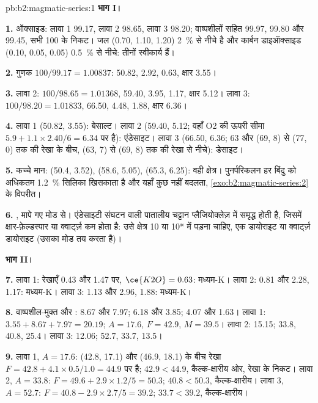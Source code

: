 \begin{solution}{pb:b2:magmatic-series:1}
\noindent\textbf{भाग I।}

\textbf{1.} ऑक्साइड: लावा 1 99.17, लावा 2 98.65, लावा 3 98.20; वाष्पशीलों सहित
99.97, 99.80 और 99.45, सभी 100 के निकट। जल (0.70, 1.10, 1.20)
\qty{2}{\percent} से नीचे है और कार्बन डाइऑक्साइड (0.10, 0.05, 0.05) \qty{0.5}{\percent} से नीचे: तीनों
स्वीकार्य हैं।

\textbf{2.} गुणक $100/99.17 = 1.00837$:  50.82,  2.92, 
0.63, क्षार 3.55।

\textbf{3.} लावा 2: $100/98.65 = 1.01368$,  59.40,  3.95, 
1.17, क्षार 5.12। लावा 3: $100/98.20 = 1.01833$,  66.50,  4.48,
 1.88, क्षार 6.36।

\textbf{4.} लावा 1 (50.82, 3.55): बेसाल्ट। लावा 2 (59.40, 5.12; वहाँ O2 की ऊपरी सीमा
$5.9 + 1.1\times2.40/6 = 6.34$ पर है): एंडेसाइट। लावा 3 (66.50, 6.36; 63
और (69, 8) से (77, 0) तक की रेखा के बीच, (63, 7) से (69, 8) तक की रेखा से नीचे): डेसाइट।

\textbf{5.} कच्चे मान: (50.4, 3.52), (58.6, 5.05), (65.3, 6.25): वही क्षेत्र।
पुनर्परिकलन हर बिंदु को अधिकतम \qty{1.2}{\percent} सिलिका खिसकाता है और
यहाँ कुछ नहीं बदलता, \cref{exo:b2:magmatic-series:2} के विपरीत।

\textbf{6.} , मापे गए मोड से। एंडेसाइटी संघटन वाली पातालीय चट्टान
प्लैजियोक्लेज़ में समृद्ध होती है, जिसमें क्षार-फ़ेल्डस्पार या क्वार्ट्ज़ कम होता है: उसे
क्षेत्र 10 या 10* में पड़ना चाहिए, एक डायोराइट या क्वार्ट्ज़ डायोराइट (उसका मोड तय करता है)।

\noindent\textbf{भाग II।}

\textbf{7.} लावा 1: रेखाएँ 0.43 और 1.47 पर, $\ce{K2O} = 0.63$: मध्यम-K। लावा 2: 0.81
और 2.28, 1.17: मध्यम-K। लावा 3: 1.13 और 2.96, 1.88: मध्यम-K।

\textbf{8.} वाष्पशील-मुक्त  और : 8.67 और 7.97; 6.18 और 3.85; 4.07
और 1.63। लावा 1: $3.55 + 8.67 + 7.97 = 20.19$; $A = 17.6$, $F = 42.9$, $M = 39.5$।
लावा 2: 15.15; 33.8, 40.8, 25.4। लावा 3: 12.06; 52.7, 33.7, 13.5।

\textbf{9.} लावा 1, $A = 17.6$: (42.8, 17.1) और (46.9, 18.1) के बीच रेखा
$F = 42.8 + 4.1\times0.5/1.0 = 44.9$ पर है; $42.9 < 44.9$, कैल्क-क्षारीय ओर, रेखा के
निकट। लावा 2, $A = 33.8$: $F = 49.6 + 2.9\times1.2/5 = 50.3$; $40.8 < 50.3$,
कैल्क-क्षारीय। लावा 3, $A = 52.7$: $F = 40.8 - 2.9\times2.7/5 = 39.2$; $33.7 < 39.2$,
कैल्क-क्षारीय।


\end{solution}
